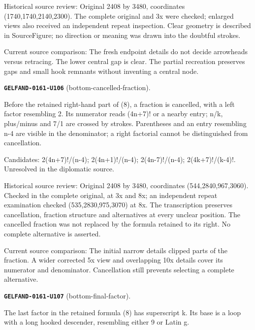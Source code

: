 Historical source review: Original 2408 by 3480, coordinates (1740,1740,2140,2300). The complete original and 3x were checked; enlarged views also received an independent repeat inspection. Clear geometry is described in SourceFigure; no direction or meaning was drawn into the doubtful strokes.\par
Current source comparison: The fresh endpoint details do not decide arrowheads versus retracing. The lower central gap is clear. The partial recreation preserves gaps and small hook remnants without inventing a central node.\par\medskip
\par\noindent\leavevmode{}\label{GELFAND-0161-U106}\label{GELFAND-P001487:bottom-cancelled-fraction}\textbf{\texttt{GELFAND-0161-U106}} (bottom-cancelled-fraction).\nopagebreak[4]\par
Before the retained right-hand part of (8), a fraction is cancelled, with a left factor resembling 2. Its numerator reads (4n+7)! or a nearby entry; n/k, plus/minus and 7/1 are crossed by strokes. Parentheses and an entry resembling n-4 are visible in the denominator; a right factorial cannot be distinguished from cancellation.\par
Candidates: 2(4n+7)!/(n-4); 2(4n+1)!/(n-4); 2(4n-7)!/(n-4); 2(4k+7)!/(k-4)!. Unresolved in the diplomatic source.\par
Historical source review: Original 2408 by 3480, coordinates (544,2840,967,3060). Checked in the complete original, at 3x and 8x; an independent repeat examination checked (535,2830,975,3070) at 8x. The transcription preserves cancellation, fraction structure and alternatives at every unclear position. The cancelled fraction was not replaced by the formula retained to its right. No complete alternative is asserted.\par
Current source comparison: The initial narrow details clipped parts of the fraction. A wider corrected 5x view and overlapping 10x details cover its numerator and denominator. Cancellation still prevents selecting a complete alternative.\par\medskip
\par\noindent\leavevmode{}\label{GELFAND-0161-U107}\label{GELFAND-P001487:bottom-final-factor}\textbf{\texttt{GELFAND-0161-U107}} (bottom-final-factor).\nopagebreak[4]\par
The last factor in the retained formula (8) has superscript k. Its base is a loop with a long hooked descender, resembling either 9 or Latin g.\par
